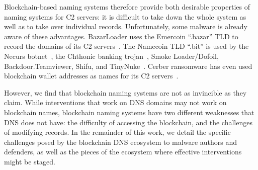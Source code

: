 Blockchain-based naming systems therefore provide both desirable properties of 
naming systems for C2 servers: it is difficult to take down the whole system as 
well as to take over individual records. Unfortunately, some malware is already 
aware of these advantages. BazarLoader uses the Emercoin ``.bazar'' TLD 
to record the domains of its C2 servers~\cite{brandt_bazarloader_2021}. The 
Namecoin TLD ``.bit'' is used by the Necurs botnet~\cite{dgas_of_necurs}, the 
Chthonic banking trojan~\cite{malware_traffic_analysis_2016}, Smoke 
Loader/Dofoil, Backdoor.Teamviewer, Shifu, and TinyNuke~\cite{abusech_2017, 
mackie_cryptodns_2018}. Cerber ransomware has 
even used blockchain wallet addresses as names for its C2 
servers~\cite{pletinckx_malware_2018}.

However, we find that blockchain naming systems are not as invincible as they 
claim. While interventions that work on DNS domains may not work on blockchain 
names, blockchain naming systems have two different 
weaknesses that DNS does not have: the difficulty of accessing the blockchain,  
and the challenges of modifying records. In the remainder of this work, we 
detail the specific challenges posed by the blockchain DNS ecosystem to malware 
authors and defenders, as well as the pieces of the ecosystem where 
effective interventions might be staged.

%

